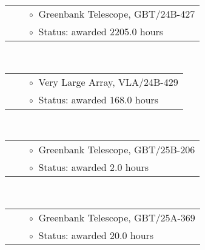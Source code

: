 \documentclass[11pt,letterpaper,sans,unicode]{moderncv}
\begin{document}
{\small
{}
\begin{tabular}{rcl}
&\hspace{0.4cm} &{\color{color1} $\circ\;\;$}Greenbank Telescope, GBT/24B-427  \\
&\hspace{0.4cm} &{\color{color1} $\circ\;\;$}Status: awarded $2205.0$ hours
\end{tabular} \\

\begin{tabular}{rcl}
&\hspace{0.4cm} &{\color{color1} $\circ\;\;$}Very Large Array, VLA/24B-429  \\
&\hspace{0.4cm} &{\color{color1} $\circ\;\;$}Status: awarded $168.0$ hours
\end{tabular} \\

\begin{tabular}{rcl}
&\hspace{0.4cm} &{\color{color1} $\circ\;\;$}Greenbank Telescope, GBT/25B-206 \\
&\hspace{0.4cm} &{\color{color1} $\circ\;\;$}Status: awarded $2.0$ hours
\end{tabular} \\

\begin{tabular}{rcl}
&\hspace{0.4cm} &{\color{color1} $\circ\;\;$}Greenbank Telescope, 
GBT/25A-369 \\
&\hspace{0.4cm} &{\color{color1} $\circ\;\;$}Status: awarded $20.0$ hours
\end{tabular} \\


}
\end{document}
